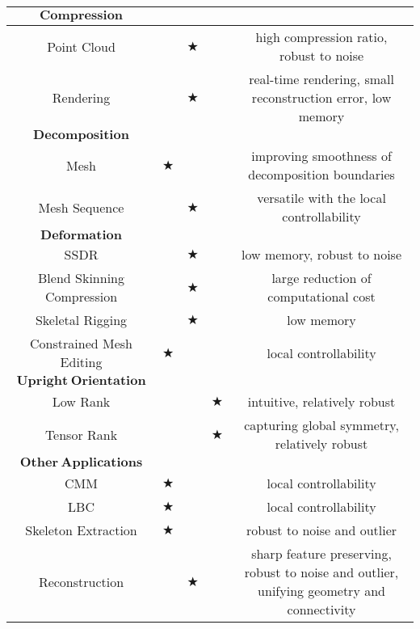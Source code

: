 \begin{table*}
\begin{center}
{\begin{tabular}{| c | ccc | c |}
     $\mathbf{Compression}$ & & & &\\ \hline
     Point Cloud\cite{digne2014self} & & $\bigstar$ & & high compression ratio, robust to noise\\
     Rendering\cite{miandji2013learning} & & $\bigstar$ & & real-time rendering, small reconstruction error, low memory \\ \hline

     $\mathbf{Decomposition}$ & & & & \\ \hline
     Mesh\cite{zhang2012variational}  & $\bigstar$ & & & improving smoothness of decomposition boundaries\\
     Mesh Sequence\cite{neumann2013sparse}  & & $\bigstar$ & & versatile with the local controllability \\ \hline

     $\mathbf{Deformation}$ & & & & \\ \hline
     SSDR\cite{le2012smooth}  & & $\bigstar$ & & low memory, robust to noise \\
     Blend Skinning Compression\cite{le2013two}  & & $\bigstar$ & & large reduction of computational cost\\
     Skeletal Rigging\cite{le2014ras}  & & $\bigstar$ & & low memory\\
     Constrained Mesh Editing\cite{deng2013exploring}  & $\bigstar$ & & & local controllability\\ \hline

     $\mathbf{Upright~Orientation}$ & & & & \\ \hline
     Low Rank\cite{jin2012unsupervised} & & & $\bigstar$ & intuitive, relatively robust\\
     Tensor Rank\cite{wang2014upright} & & & $\bigstar$ & capturing global symmetry, relatively robust\\ \hline

     $\mathbf{Other~Applications}$ & & & & \\ \hline
     CMM\cite{neumann2014compressed}  & $\bigstar$ & & & local controllability\\
     LBC\cite{zhang2014local}  & $\bigstar$ & & & local controllability\\
     Skeleton Extraction\cite{huang2013l1}  & $\bigstar$ & & & robust to noise and outlier \\
     Reconstruction\cite{xiong2014robust} & & $\bigstar$ & & sharp feature preserving, robust to noise and outlier, unifying geometry and connectivity\\ \hline

    \end{tabular}
    \label{table:overview}
}
\end{center}
\end{table*}

